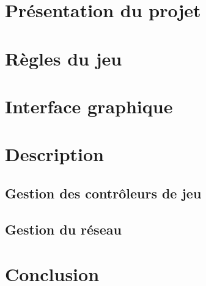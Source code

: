 \section*{Présentation du projet}


\newpage

\section{Règles du jeu}


\newpage

\section{Interface graphique}

	

\newpage

\section{Description}

	\subsection{Gestion des contrôleurs de jeu}
	
	\subsection{Gestion du réseau}
	

\newpage

\section*{Conclusion}
